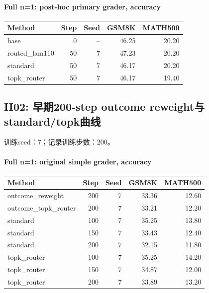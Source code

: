 \paragraph{Full n=1: post-hoc primary grader, accuracy}
{\footnotesize\setlength{\tabcolsep}{3.5pt}
\begin{longtable}{@{}p{1.4in}rrrr@{}}
\toprule
Method & Step & Seed & GSM8K & MATH500 \\
\midrule\endhead
base & 0 & -- & 46.25 & 20.20 \\
routed\_\allowbreak{}lam110 & 50 & 7 & 47.23 & 20.20 \\
standard & 50 & 7 & 46.17 & 20.20 \\
topk\_\allowbreak{}router & 50 & 7 & 46.17 & 19.40 \\
\bottomrule\end{longtable}
}
\subsection{H02: 早期200-step outcome reweight与standard/topk曲线}
\label{history:early_outcome200}
训练seed：7；记录训练步数：200。
\paragraph{Full n=1: original simple grader, accuracy}
{\footnotesize\setlength{\tabcolsep}{3.5pt}
\begin{longtable}{@{}p{1.4in}rrrr@{}}
\toprule
Method & Step & Seed & GSM8K & MATH500 \\
\midrule\endhead
outcome\_\allowbreak{}reweight & 200 & 7 & 33.36 & 12.60 \\
outcome\_\allowbreak{}topk\_\allowbreak{}router & 200 & 7 & 33.21 & 12.20 \\
standard & 100 & 7 & 35.25 & 13.80 \\
standard & 150 & 7 & 33.43 & 12.40 \\
standard & 200 & 7 & 32.15 & 11.80 \\
topk\_\allowbreak{}router & 100 & 7 & 35.25 & 14.20 \\
topk\_\allowbreak{}router & 150 & 7 & 34.87 & 12.00 \\
topk\_\allowbreak{}router & 200 & 7 & 33.89 & 13.20 \\
\bottomrule\end{longtable}
}
